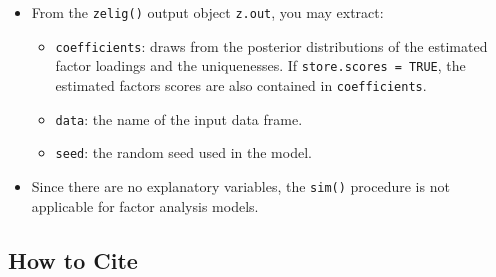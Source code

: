 \begin{itemize}
\item From the \texttt{zelig()} output object \texttt{z.out}, you may extract:

\begin{itemize}
\item \texttt{coefficients}: draws from the posterior distributions
of the estimated factor loadings and the uniquenesses.  If
\texttt{store.scores = TRUE}, the estimated factors scores are also
contained in \texttt{coefficients}.

\item \texttt{data}: the name of the input data frame.
\item \texttt{seed}: the random seed used in the model.   

\end{itemize}

\item Since there are no explanatory variables, the \texttt{sim()}
procedure is not applicable for factor analysis models.

\end{itemize}


\subsection* {How to Cite} 




